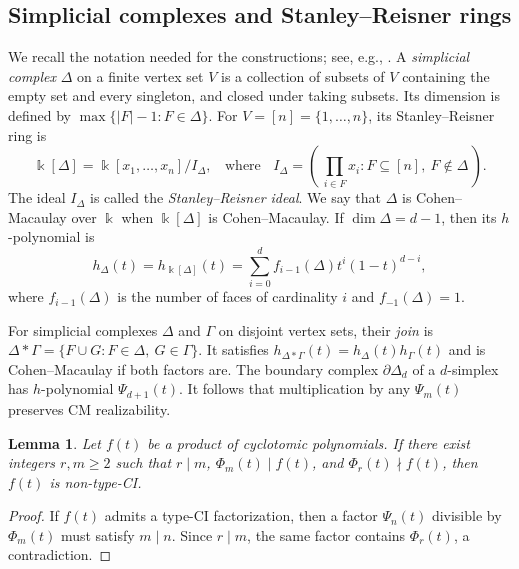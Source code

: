\documentclass[11pt,a4paper]{amsart}
\newtheorem{lemma}[lemma]{Lemma}
\theoremstyle{definition}
\theoremstyle{remark}
\newcommand{\kk}{\Bbbk}
\begin{document}
\subsection{Simplicial complexes and Stanley--Reisner rings}
We recall the notation needed for the constructions; see, e.g., \cite[Section~5.1]{BrunsHerzog}. A \emph{simplicial complex} $\Delta$ on a finite vertex set $V$ is a collection of subsets of $V$ containing the empty set and every singleton, and closed under taking subsets. Its dimension is defined by $\max\{|F|-1:F\in\Delta\}$. For $V=[n]=\{1,\ldots,n\}$, its Stanley--Reisner ring is
\[\kk[\Delta]=\kk[x_1,\ldots,x_n]/I_\Delta,\;\;\text{ where }\;\; I_\Delta=(\,\textstyle\prod_{i\in F}x_i:F\subseteq[n],\ F\notin\Delta\,).\]
The ideal $I_\Delta$ is called the \emph{Stanley--Reisner ideal}. We say that $\Delta$ is Cohen--Macaulay over $\kk$ when $\kk[\Delta]$ is Cohen--Macaulay.
If $\dim\Delta=d-1$, then its $h$-polynomial is \[h_\Delta(t)=h_{\kk[\Delta]}(t)=\sum_{i=0}^d f_{i-1}(\Delta)t^i(1-t)^{d-i},\]
where $f_{i-1}(\Delta)$ is the number of faces of cardinality $i$ and $f_{-1}(\Delta)=1$.

For simplicial complexes $\Delta$ and $\Gamma$ on disjoint vertex sets, their \emph{join} is $\Delta*\Gamma=\{F\cup G:F\in\Delta,\ G\in\Gamma\}$. It satisfies $h_{\Delta*\Gamma}(t)=h_\Delta(t)h_\Gamma(t)$ and is Cohen--Macaulay if both factors are. The boundary complex $\partial\Delta_d$ of a $d$-simplex has $h$-polynomial $\Psi_{d+1}(t)$. It follows that multiplication by any $\Psi_m(t)$ preserves CM realizability.

\begin{lemma}\label{lem:missing-divisor}
Let $f(t)$ be a product of cyclotomic polynomials. If there exist integers $r,m\ge2$ such that $r\mid m$, $\Phi_m(t)\mid f(t)$, and $\Phi_r(t)\nmid f(t)$, then $f(t)$ is non-type-CI.
\end{lemma}
\begin{proof}
If $f(t)$ admits a type-CI factorization, then a factor $\Psi_n(t)$ divisible by $\Phi_m(t)$ must satisfy $m\mid n$. Since $r \mid m$, the same factor contains $\Phi_r(t)$, a contradiction.
\end{proof}

\bigskip
\end{document}
